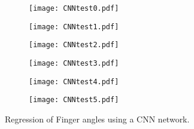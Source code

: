 \documentclass[../main.tex]{subfiles}
\begin{document}
\begin{figure}
     \centering
     \begin{subfigure}[b]{0.49\textwidth}
         \centering
         \texttt{[image: CNNtest0.pdf]}
         \caption{}
         \label{fig:y equals x}
     \end{subfigure}
     \hfill
     \centering
     \begin{subfigure}[b]{0.49\textwidth}
         \centering
         \texttt{[image: CNNtest1.pdf]}
         \caption{}
         \label{fig:y equals x}
     \end{subfigure}
     \hfill
     \begin{subfigure}[b]{0.49\textwidth}
         \centering
         \texttt{[image: CNNtest2.pdf]}
         \caption{}
         \label{fig:three sin x}
     \end{subfigure}
     \hfill
     \begin{subfigure}[b]{0.49\textwidth}
         \centering
         \texttt{[image: CNNtest3.pdf]}
         \caption{}
         \label{fig:five over x}
     \end{subfigure}
     \hfill
     \begin{subfigure}[b]{0.49\textwidth}
         \centering
         \texttt{[image: CNNtest4.pdf]}
         \caption{}
         \label{fig:five over x}
     \end{subfigure}
     \hfill
     \begin{subfigure}[b]{0.49\textwidth}
         \centering
         \texttt{[image: CNNtest5.pdf]}
         \caption{}
         \label{fig:five over x}
     \end{subfigure}
     \hfill
     \caption{Regression of Finger angles using a CNN network.}
     \label{fig:CNNregression}
\end{figure}
\end{document}
